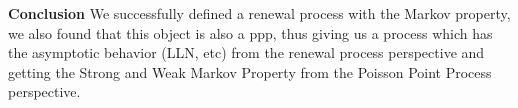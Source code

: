 \noindent \textbf{Conclusion} We successfully defined a renewal process with the Markov property, we also found that this object is also a ppp, thus giving us a process which has the asymptotic behavior (LLN, etc) from the renewal process perspective and getting the Strong and Weak Markov Property from the Poisson Point Process perspective. 


